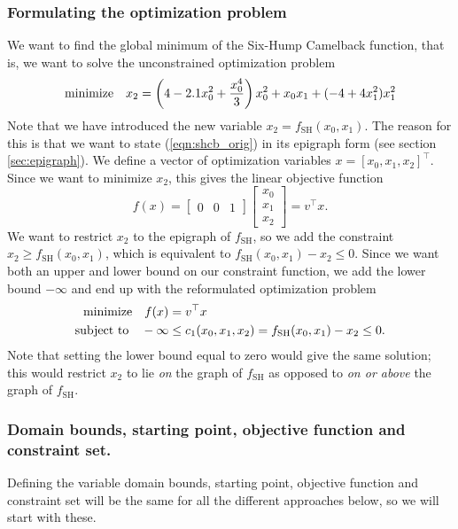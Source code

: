 \subsubsection{Formulating the optimization problem}
We want to find the global minimum of the Six-Hump Camelback function, that is, we want to solve the unconstrained optimization problem
\begin{equation}
\mathrm{minimize} \ \ \  x_2 = \left( 4 - 2.1x_0^2 + \frac{x_0^4}{3} \right)x_0^2 + x_0x_1 + (-4 + 4x_1^2) x_1^2
\label{eqn:shcb_orig}
\end{equation}
Note that we have introduced the new variable $x_2 = f_{\mathrm{SH}}(x_0, x_1)$. The reason for this is that we want to state (\ref{eqn:shcb_orig}) in its epigraph form (see section \ref{sec:epigraph}). We define a vector of optimization variables $x = [x_0, x_1, x_2]^\top$. Since we want to minimize $x_2$, this gives the linear objective function
\begin{equation}
f(x) = \begin{bmatrix} 0 & 0 & 1 \end{bmatrix} \begin{bmatrix} x_0 \\ x_1 \\ x_2 \end{bmatrix} = v^\top x.
\label{eqn:shcb_linobj}
\end{equation}
We want to restrict $x_2$ to the epigraph of $f_{\mathrm{SH}}$, so we add the constraint $x_2 \geq f_{\mathrm{SH}}(x_0, x_1)$, which is equivalent to $f_{\mathrm{SH}}(x_0, x_1) - x_2 \leq 0$. Since we want both an upper and lower bound on our constraint function, we add the lower bound $-\infty$ and end up with the reformulated optimization problem
\begin{subequations}
\begin{align}
\mathrm{minimize} \ \ \  f(x) &= v^\top x \\
\mathrm{subject\ to} \ \ \  -\infty &\leq c_1(x_0, x_1, x_2) = f_{\mathrm{SH}}(x_0, x_1) - x_2 \leq 0. \label{eqn:shcb_reform_constr}
\end{align}
\end{subequations}
Note that setting the lower bound equal to zero would give the same solution; this would restrict $x_2$ to lie \emph{on} the graph of $f_{\mathrm{SH}}$ as opposed to \emph{on or above} the graph of $f_{\mathrm{SH}}$.

\subsubsection{Domain bounds, starting point, objective function and constraint set.} Defining the variable domain bounds,  starting point, objective function and constraint set will be the same for all the different approaches below, so we will start with these.

